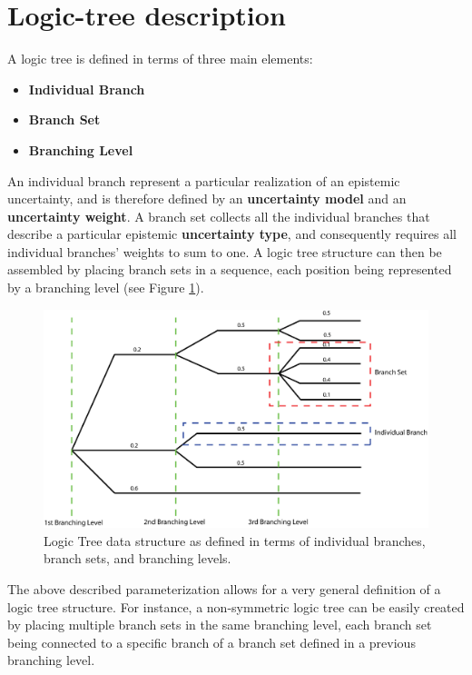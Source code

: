 \section{Logic-tree description}
\label{hazard:logic_tree}
A logic tree is defined in terms of three main elements:
\begin{itemize}
\item \textbf{Individual Branch}
\item \textbf{Branch Set}
\item \textbf{Branching Level}
\end{itemize}
An individual branch represent a particular realization of an epistemic 
uncertainty, and is therefore defined by an \textbf{uncertainty model} 
and an \textbf{uncertainty weight}. A branch set collects all the individual
branches that describe a particular epistemic \textbf{uncertainty type},
and consequently requires all individual branches' weights to sum to one. 
A logic tree structure can then be assembled by placing branch sets in a 
sequence, each position being represented by a branching level (see Figure 
\ref{fig:LogicTreeGeneralStructure}).
\begin{figure}
\includegraphics[width=15cm]{./Figures/Part_Hazard/LogicTreeGeneralStructure.eps}
\caption{Logic Tree data structure as defined in terms of individual branches, 
branch sets, and branching levels.}
\label{fig:LogicTreeGeneralStructure}
\end{figure}
The above described parameterization allows for a very general definition of a 
logic tree structure. For instance, a non-symmetric logic tree can be easily 
created by placing multiple branch sets in the same branching level, each 
branch set being connected to a specific branch of a branch set defined in a
previous branching level.
